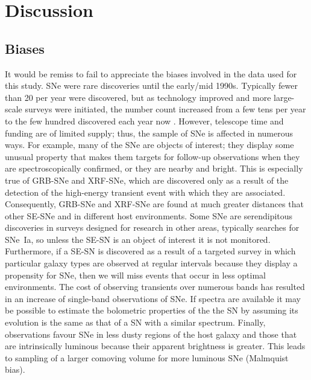\documentclass[a4paper,fleqn,usenatbib]{mnras}
\begin{document}
\section{Discussion}
\subsection{Biases}
It would be remiss to fail to appreciate the biases involved in the data used for this study. SNe were rare discoveries until the early/mid 1990s. Typically fewer than 20 per year were discovered, but as technology improved and more large-scale surveys were initiated, the number count increased from a few tens per year to the few hundred discovered each year now \citep[e.g.,][]{Galyam2013}. However, telescope time and funding are of limited supply; thus, the sample of SNe is affected in numerous ways. For example, many of the SNe are objects of interest; they display some unusual property that makes them targets for follow-up observations when they are spectroscopically confirmed, or they are nearby and bright. This is especially true of GRB-SNe and XRF-SNe, which are discovered only as a result of the detection of the high-energy transient event with which they are associated. Consequently, GRB-SNe and XRF-SNe are found at much greater distances that other SE-SNe and in different host environments. Some SNe are serendipitous discoveries in surveys designed for research in other areas, typically searches for SNe~Ia, so unless the SE-SN is an object of interest it is not monitored. Furthermore, if a SE-SN is discovered as a result of a targeted survey in which particular galaxy types are observed at regular intervals because they display a propensity for SNe, then we will miss events that occur in less optimal environments. The cost of observing transients over numerous bands has resulted in an increase of single-band observations of SNe. If spectra are available it may be possible to estimate the bolometric properties of the the SN by assuming its evolution is the same as that of a SN with a similar spectrum. Finally, observations favour SNe in less dusty regions of the host galaxy and those that are intrinsically luminous because their apparent brightness is greater. This leads to sampling of a larger comoving volume for more luminous SNe (Malmquist bias).
\end{document}
